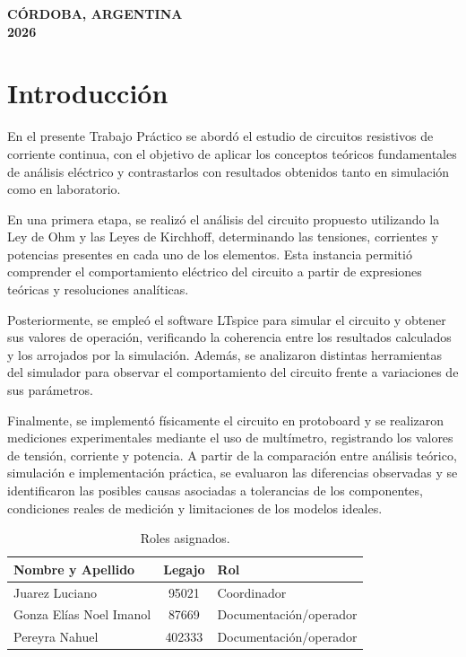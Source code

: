 \documentclass[a4paper,12pt]{article}
\begin{document}
	\vfill
	\begin{center}
		\textbf{CÓRDOBA, ARGENTINA}\\
		\textbf{2026}
	\end{center}
	\pagestyle{empty}
	\newpage
	\pagestyle{miestilo}
	\tableofcontents
	\newpage
	
	
	\section*{Introducción}
	En el presente Trabajo Práctico se abordó el estudio de circuitos resistivos de corriente continua, con el objetivo de aplicar los conceptos teóricos fundamentales de análisis eléctrico y contrastarlos con resultados obtenidos tanto en simulación como en laboratorio.
	
	En una primera etapa, se realizó el análisis del circuito propuesto utilizando la Ley de Ohm y las Leyes de Kirchhoff, determinando las tensiones, corrientes y potencias presentes en cada uno de los elementos. Esta instancia permitió comprender el comportamiento eléctrico del circuito a partir de expresiones teóricas y resoluciones analíticas.
	
	Posteriormente, se empleó el software LTspice para simular el circuito y obtener sus valores de operación, verificando la coherencia entre los resultados calculados y los arrojados por la simulación. Además, se analizaron distintas herramientas del simulador para observar el comportamiento del circuito frente a variaciones de sus parámetros.
	
	Finalmente, se implementó físicamente el circuito en protoboard y se realizaron mediciones experimentales mediante el uso de multímetro, registrando los valores de tensión, corriente y potencia. A partir de la comparación entre análisis teórico, simulación e implementación práctica, se evaluaron las diferencias observadas y se identificaron las posibles causas asociadas a tolerancias de los componentes, condiciones reales de medición y limitaciones de los modelos ideales.
	
	
	\begin{table}[h]
		\centering
		\begin{tabular}{|l|c|l|}
			\hline
			\textbf{Nombre y Apellido} & \textbf{Legajo} & \textbf{Rol} \\ \hline
			
			
			Juarez Luciano & 95021 & Coordinador \\ \hline
			Gonza Elías Noel Imanol & 87669 & Documentación/operador \\ \hline
			Pereyra Nahuel & 402333 & Documentación/operador \\ \hline
		\end{tabular}
		\caption{Roles asignados.}
	\end{table}
	
\end{document}
